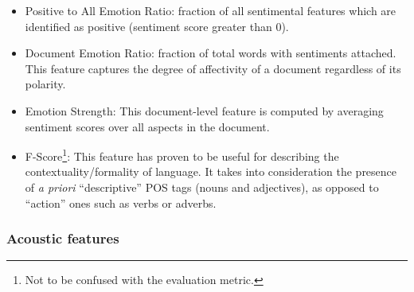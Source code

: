 \begin{itemize}
    \item Positive to All Emotion Ratio: fraction of all sentimental features which are identified as positive (sentiment score greater than 0). 
    \item Document Emotion Ratio: fraction of total words with sentiments attached. This feature captures the degree of affectivity of a document regardless of its polarity.
    \item Emotion Strength: This document-level feature is computed by averaging sentiment scores over all aspects in the document.
    \item F-Score\footnote{Not to be confused with the evaluation metric.}: This feature has proven to be useful for describing the contextuality/formality of language. It takes into consideration the presence of \textit{a priori} ``descriptive'' POS tags (nouns and adjectives), as opposed to ``action'' ones such as verbs or adverbs.
    
\end{itemize}

\subsubsection{Acoustic features}

